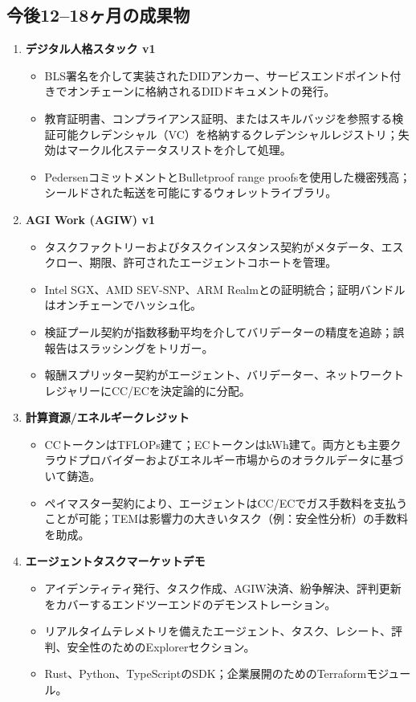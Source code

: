 \documentclass[11pt]{article}
\begin{document}
\subsection{今後12--18ヶ月の成果物}
\begin{enumerate}[label=\textbf{D\arabic*.}, leftmargin=*]
  \item \textbf{デジタル人格スタック v1}
  \begin{itemize}[noitemsep]
    \item BLS署名を介して実装されたDIDアンカー、サービスエンドポイント付きでオンチェーンに格納されるDIDドキュメントの発行。
    \item 教育証明書、コンプライアンス証明、またはスキルバッジを参照する検証可能クレデンシャル（VC）を格納するクレデンシャルレジストリ；失効はマークル化ステータスリストを介して処理。
    \item PedersenコミットメントとBulletproof range proofsを使用した機密残高；シールドされた転送を可能にするウォレットライブラリ。
  \end{itemize}
  \item \textbf{AGI Work (AGIW) v1}
  \begin{itemize}[noitemsep]
    \item タスクファクトリーおよびタスクインスタンス契約がメタデータ、エスクロー、期限、許可されたエージェントコホートを管理。
    \item Intel SGX、AMD SEV-SNP、ARM Realmとの証明統合；証明バンドルはオンチェーンでハッシュ化。
    \item 検証プール契約が指数移動平均を介してバリデーターの精度を追跡；誤報告はスラッシングをトリガー。
    \item 報酬スプリッター契約がエージェント、バリデーター、ネットワークトレジャリーにCC/ECを決定論的に分配。
  \end{itemize}
  \item \textbf{計算資源/エネルギークレジット}
  \begin{itemize}[noitemsep]
    \item CCトークンはTFLOPs建て；ECトークンはkWh建て。両方とも主要クラウドプロバイダーおよびエネルギー市場からのオラクルデータに基づいて鋳造。
    \item ペイマスター契約により、エージェントはCC/ECでガス手数料を支払うことが可能；TEMは影響力の大きいタスク（例：安全性分析）の手数料を助成。
  \end{itemize}
  \item \textbf{エージェントタスクマーケットデモ}
  \begin{itemize}[noitemsep]
    \item アイデンティティ発行、タスク作成、AGIW決済、紛争解決、評判更新をカバーするエンドツーエンドのデモンストレーション。
    \item リアルタイムテレメトリを備えたエージェント、タスク、レシート、評判、安全性のためのExplorerセクション。
    \item Rust、Python、TypeScriptのSDK；企業展開のためのTerraformモジュール。
  \end{itemize}
\end{enumerate}
\end{document}
